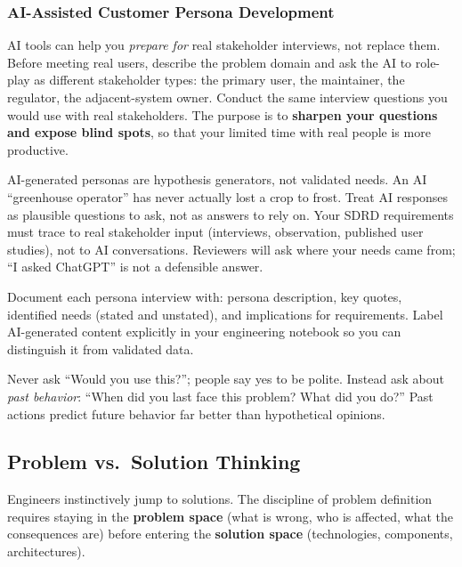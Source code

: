 \documentclass[11pt,letterpaper,twoside,openany]{book}
\begin{document}
\subsubsection{AI-Assisted Customer Persona Development}
AI tools can help you \emph{prepare for} real stakeholder interviews, not replace them. Before meeting real users, describe the problem domain and ask the AI to role-play as different stakeholder types: the primary user, the maintainer, the regulator, the adjacent-system owner. Conduct the same interview questions you would use with real stakeholders. The purpose is to \textbf{sharpen your questions and expose blind spots}, so that your limited time with real people is more productive.

\begin{warningbox}
AI-generated personas are hypothesis generators, not validated needs. An AI ``greenhouse operator'' has never actually lost a crop to frost. Treat AI responses as plausible questions to ask, not as answers to rely on. Your SDRD requirements must trace to real stakeholder input (interviews, observation, published user studies), not to AI conversations. Reviewers will ask where your needs came from; ``I asked ChatGPT'' is not a defensible answer.
\end{warningbox}

Document each persona interview with: persona description, key quotes, identified needs (stated and unstated), and implications for requirements. Label AI-generated content explicitly in your engineering notebook so you can distinguish it from validated data.

\begin{tipbox}
Never ask ``Would you use this?''; people say yes to be polite. Instead ask about \emph{past behavior}: ``When did you last face this problem? What did you do?'' Past actions predict future behavior far better than hypothetical opinions.
\end{tipbox}


\subsection{Problem vs.\ Solution Thinking}
Engineers instinctively jump to solutions. The discipline of problem definition requires staying in the \textbf{problem space} (what is wrong, who is affected, what the consequences are) before entering the \textbf{solution space} (technologies, components, architectures).
\end{document}
